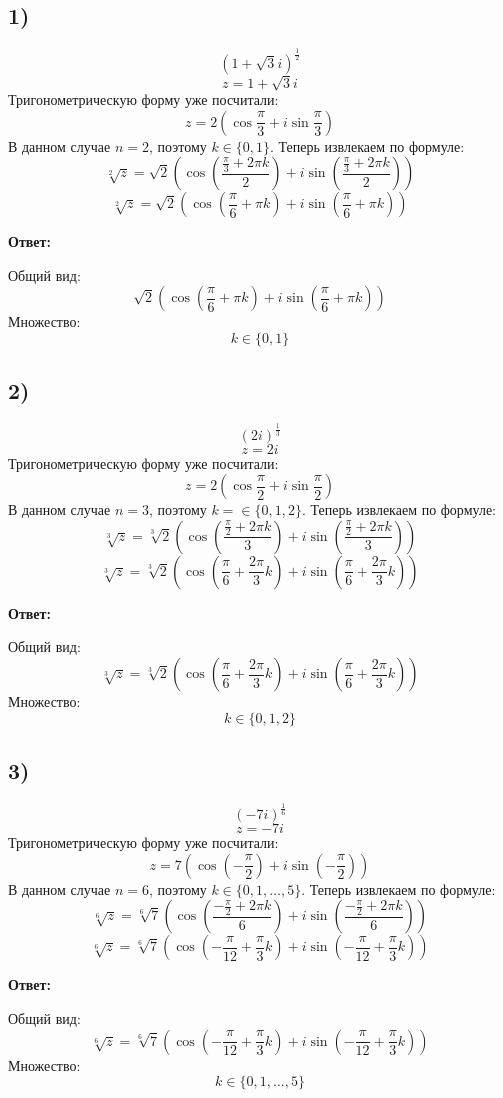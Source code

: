 \documentclass[a4paper, 12pt]{article}
\begin{document}
\subsection*{1)}
\[
(1 + \sqrt{3}i)^{\frac{1}{2}}
\]
\[
z = 1 + \sqrt{3}i
\]
Тригонометрическую форму уже посчитали:
\[
z
=
2 \left(
\cos \frac{\pi}{3}
+ 
i
\sin \frac{\pi}{3}
\right)
\]
В данном случае $n = 2$, поэтому $k \in \{0, 1\}$. Теперь извлекаем по формуле:
\[
\sqrt[2]{z} = \sqrt{2}
 \left(
\cos 
\left(
\frac{ \frac{\pi}{3}+ 2 \pi k}{2}
\right)
+
i
\sin
\left(
\frac{ \frac{\pi}{3}+ 2 \pi k}{2}
\right)
\right)
\]
\[
\sqrt[2]{z} = \sqrt{2}
 \left(
\cos 
\left(
\frac{\pi}{6} + \pi k
\right)
+
i
\sin
\left(
\frac{\pi}{6} + \pi k
\right)
\right)
\]
\begin{center}
\textbf{Ответ: } 

Общий вид:
\[
 \sqrt{2}
 \left(
\cos 
\left(
\frac{\pi}{6} + \pi k
\right)
+
i
\sin
\left(
\frac{\pi}{6} + \pi k
\right)
\right)
\]
Множество:
\[
k \in \{0, 1\}
\]
\end{center}

\clearpage
\subsection*{2)}
\[
(2i)^{\frac{1}{3}}
\]
\[
z = 2i
\]
Тригонометрическую форму уже посчитали:
\[
z
=
2  \left(
\cos  \frac{\pi}{2}
+ 
i
\sin  \frac{\pi}{2}
\right)
\]
В данном случае $n = 3$, поэтому $k = \in \{0, 1, 2\}$. Теперь извлекаем по формуле:
\[
\sqrt[3]{z} = \sqrt[3]{2}
 \left(
\cos 
\left(
\frac{ \frac{\pi}{2}+ 2 \pi k}{3}
\right)
+
i
\sin
\left(
\frac{ \frac{\pi}{2}+ 2 \pi k}{3}
\right)
\right)
\]
\[
\sqrt[3]{z} = \sqrt[3]{2}
 \left(
\cos 
\left(
\frac{\pi}{6} + \frac{2\pi}{3} k
\right)
+
i
\sin
\left(
\frac{\pi}{6} + \frac{2\pi}{3} k
\right)
\right)
\]
\begin{center}
\textbf{Ответ: } 

Общий вид:
\[
\sqrt[3]{z} = \sqrt[3]{2}
 \left(
\cos 
\left(
\frac{\pi}{6} + \frac{2\pi}{3} k
\right)
+
i
\sin
\left(
\frac{\pi}{6} + \frac{2\pi}{3} k
\right)
\right)
\]
Множество:
\[
k \in \{0, 1, 2\}
\]
\end{center}
\clearpage
\subsection*{3)}
\[
(-7i)^{\frac{1}{6}}
\]
\[
z = -7i
\]
Тригонометрическую форму уже посчитали:
\[
z
=
7  \left(
\cos  \left( -\frac{\pi}{2} \right)
+ 
i
\sin  \left( -\frac{\pi}{2} \right)
\right)
\]
В данном случае $n = 6$, поэтому $k \in \{0, 1, \ldots, 5\}$. Теперь извлекаем по формуле:
\[
\sqrt[6]{z} = \sqrt[6]{7}
 \left(
\cos 
\left(
\frac{ -\frac{\pi}{2}+ 2 \pi k}{6}
\right)
+
i
\sin
\left(
\frac{ -\frac{\pi}{2}+ 2 \pi k}{6}
\right)
\right)
\]
\[
\sqrt[6]{z} = \sqrt[6]{7}
 \left(
\cos 
\left(
-\frac{\pi}{12} + \frac{\pi}{3} k
\right)
+
i
\sin
\left(
-\frac{\pi}{12} + \frac{\pi}{3} k
\right)
\right)
\]
\begin{center}
\textbf{Ответ: } 

Общий вид:
\[
\sqrt[6]{z} = \sqrt[6]{7}
 \left(
\cos 
\left(
-\frac{\pi}{12} + \frac{\pi}{3} k
\right)
+
i
\sin
\left(
-\frac{\pi}{12} + \frac{\pi}{3} k
\right)
\right)
\]
Множество:
\[
k \in \{0, 1, \ldots, 5\}
\]
\end{center}
\clearpage
\end{document}

